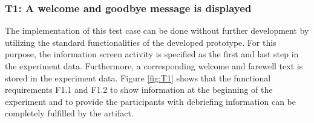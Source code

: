 
\subsubsection*{T1: A welcome and goodbye message is displayed} 


The implementation of this test case can be done without further development by utilizing the standard functionalities of the developed prototype. For this purpose, the information screen activity is specified as the first and last step in the experiment data. Furthermore, a corresponding welcome and farewell text is stored in the experiment data. Figure \ref{fig:T1} shows that the functional requirements F1.1 and F1.2 to show information at the beginning of the experiment and to provide the participants with debriefing information can be completely fulfilled by the artifact.

